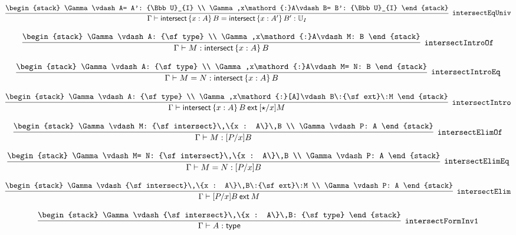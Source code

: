 \[
\infer[{\tt intersectEqUniv}]{\Gamma \vdash {\sf intersect}\,\{x : A\}\,B= {\sf intersect}\,\{x : A'\}\,B': {\Bbb U}_{I}}{
\begin{stack}
\Gamma \vdash A= A': {\Bbb U}_{I}
\\
\Gamma ,x\mathord{:}A\vdash B= B': {\Bbb U}_{I}
\end{stack}}
\]

\[
\infer[{\tt intersectIntroOf}]{\Gamma \vdash M: {\sf intersect}\,\{x : A\}\,B}{
\begin{stack}
\Gamma \vdash A: {\sf type}
\\
\Gamma ,x\mathord{:}A\vdash M: B
\end{stack}}
\]

\[
\infer[{\tt intersectIntroEq}]{\Gamma \vdash M= N: {\sf intersect}\,\{x : A\}\,B}{
\begin{stack}
\Gamma \vdash A: {\sf type}
\\
\Gamma ,x\mathord{:}A\vdash M= N: B
\end{stack}}
\]

\[
\infer[{\tt intersectIntro}]{\Gamma \vdash {\sf intersect}\,\{x : A\}\,B\:{\sf ext}\:[\star /x]M}{
\begin{stack}
\Gamma \vdash A: {\sf type}
\\
\Gamma ,x\mathord{:}[A]\vdash B\:{\sf ext}\:M
\end{stack}}
\]

\[
\infer[{\tt intersectElimOf}]{\Gamma \vdash M: [P/x]B}{
\begin{stack}
\Gamma \vdash M: {\sf intersect}\,\{x : A\}\,B
\\
\Gamma \vdash P: A
\end{stack}}
\]

\[
\infer[{\tt intersectElimEq}]{\Gamma \vdash M= N: [P/x]B}{
\begin{stack}
\Gamma \vdash M= N: {\sf intersect}\,\{x : A\}\,B
\\
\Gamma \vdash P: A
\end{stack}}
\]

\[
\infer[{\tt intersectElim}]{\Gamma \vdash [P/x]B\:{\sf ext}\:M}{
\begin{stack}
\Gamma \vdash {\sf intersect}\,\{x : A\}\,B\:{\sf ext}\:M
\\
\Gamma \vdash P: A
\end{stack}}
\]

\[
\infer[{\tt intersectFormInv1}]{\Gamma \vdash A: {\sf type}}{
\begin{stack}
\Gamma \vdash {\sf intersect}\,\{x : A\}\,B: {\sf type}
\end{stack}}
\]

